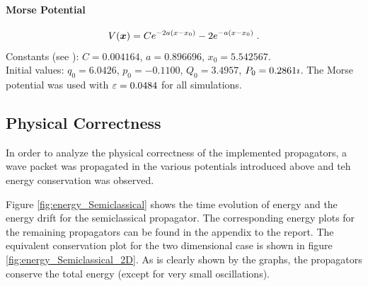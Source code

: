 \paragraph{Morse Potential}
%
\begin{align}
	\label{math:morse}
	V(\bm{x}) = C e^{-2a(x-x_0)} - 2 e^{-a(x-x_0)} \; .
\end{align}
%
Constants (see \cite{Unpublished}): $C = 0.004164$, $a=0.896696$, $x_0 = 5.542567$. \\
Initial values: $q_0 = 6.0426$, $p_0 = -0.1100$, $Q_0 = 3.4957$, $P_0 = 0.2861 \imath$.
The Morse potential was used with $\varepsilon = 0.0484$ for all simulations.


\subsection{Physical Correctness}
\label{subsec:physical}
%
In order to analyze the physical correctness of the implemented propagators, a wave packet was propagated in the various potentials introduced above and teh energy conservation was observed.
\par\medskip
%
Figure \ref{fig:energy_Semiclassical} shows the time evolution of energy and the energy drift for the semiclassical propagator. The corresponding energy plots for the remaining propagators can be found in the appendix to the report.
The equivalent conservation plot for the two dimensional case is shown in figure \ref{fig:energy_Semiclassical_2D}.
As is clearly shown by the graphs, the propagators conserve the total energy (except for very small oscillations).
%
